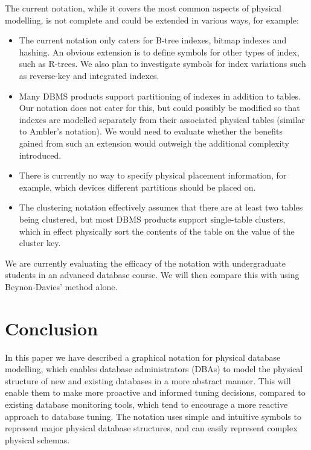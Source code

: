 \documentclass{CRPITStyle}
\begin{document}
The current notation, while it covers the most common aspects of
physical modelling, is not complete and could be extended in various
ways, for example:
\begin{itemize}

	\item The current notation only caters for B-tree indexes, bitmap
	indexes and hashing. An obvious extension is to define symbols for
	other types of index, such as R-trees. We also plan to investigate
	symbols for index variations such as reverse-key and integrated
	indexes.
	
	\item Many DBMS products support partitioning of indexes in addition
	to tables. Our notation does not cater for this, but could possibly
	be modified so that indexes are modelled separately from their
	associated physical tables (similar to Ambler's notation). We would
	need to evaluate whether the benefits gained from such an extension
	would outweigh the additional complexity introduced.
	
	\item There is currently no way to specify physical placement
	information, for example, which devices different partitions should
	be placed on.
	
	\item The clustering notation effectively assumes that there are at
	least two tables being clustered, but most DBMS products support
	single-table clusters, which in effect physically sort the contents
	of the table on the value of the cluster key.
	
\end{itemize}

We are currently evaluating the efficacy of the notation with
undergraduate students in an advanced database course. We will then
compare this with using Beynon-Davies' method alone.


\section{Conclusion}
\label{sec-conclusion}

In this paper we have described a graphical notation for physical
database modelling, which enables database administrators (DBAs) to
model the physical structure of new and existing databases in a more
abstract manner. This will enable them to make more proactive and
informed tuning decisions, compared to existing database monitoring
tools, which tend to encourage a more reactive approach to database
tuning. The notation uses simple and intuitive symbols to represent
major physical database structures, and can easily represent complex
physical schemas.
\end{document}
